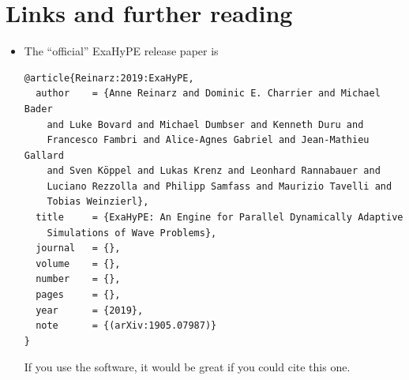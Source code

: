 \section*{Links and further reading}

\begin{itemize}
  \item The ``official'' ExaHyPE release paper is
  \begin{verbatim}
@article{Reinarz:2019:ExaHyPE,   
  author    = {Anne Reinarz and Dominic E. Charrier and Michael Bader 
    and Luke Bovard and Michael Dumbser and Kenneth Duru and 
    Francesco Fambri and Alice-Agnes Gabriel and Jean-Mathieu Gallard 
    and Sven Köppel and Lukas Krenz and Leonhard Rannabauer and 
    Luciano Rezzolla and Philipp Samfass and Maurizio Tavelli and 
    Tobias Weinzierl}, 
  title     = {ExaHyPE: An Engine for Parallel Dynamically Adaptive 
    Simulations of Wave Problems},   
  journal   = {},
  volume    = {},   
  number    = {},
  pages     = {},
  year      = {2019},   
  note      = {(arXiv:1905.07987)} 
}   
  \end{verbatim}
  If you use the software, it would be great if you could cite this one.
\end{itemize}

